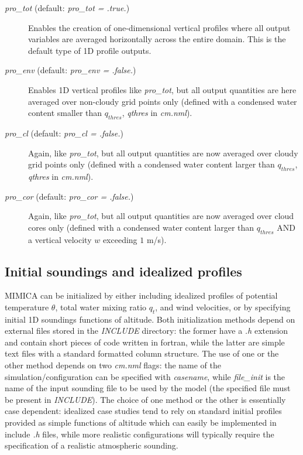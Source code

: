 \documentclass[12pt,A4,french]{article}
\begin{document}
\begin{description}

\item[{\it pro\_tot} (default: {\it pro\_tot = .true.})]

Enables the creation of one-dimensional vertical profiles where all output variables are averaged horizontally across the entire domain. This is the default type of 1D profile outputs. 

\item[{\it pro\_env} (default: {\it pro\_env = .false.})]

Enables 1D vertical profiles like {\it pro\_tot}, but all output quantities are here averaged over non-cloudy grid points only (defined with a condensed water content smaller than $q_{thres}$, {\it qthres} in {\it cm.nml}).

\item[{\it pro\_cl} (default: {\it pro\_cl = .false.})]

Again, like {\it pro\_tot}, but all output quantities are now averaged over cloudy grid points only (defined with a condensed water content larger than $q_{thres}$, {\it qthres} in {\it cm.nml}).

\item[{\it pro\_cor} (default: {\it pro\_cor = .false.})]

Again, like {\it pro\_tot}, but all output quantities are now averaged over cloud cores only (defined with a condensed water content larger than $q_{thres}$ AND a vertical velocity $w$ exceeding $1$ m/s).

\end{description}

\subsection{Initial soundings and idealized profiles}

MIMICA can be initialized by either including idealized profiles of potential temperature $\theta$, total water mixing ratio $q_t$, and wind velocities, or by specifying initial 1D soundings functions of altitude. Both initialization methods depend on external files stored in the {\it INCLUDE} directory: the former have a {\it .h} extension and contain short pieces of code written in fortran, while the latter are simple text files with a standard formatted column structure. The use of one or the other method depends on two {\it cm.nml} flags: the name of the simulation/configuration can be specified with {\it casename}, while {\it file\_init} is the name of the input sounding file to be used by the model (the specified file must be present in {\it INCLUDE}). The choice of one method or the other is essentially case dependent: idealized case studies tend to rely on standard initial profiles provided as simple functions of altitude which can easily be implemented in include {\it .h} files, while more realistic configurations will typically require the specification of a realistic atmospheric sounding.
\end{document}
